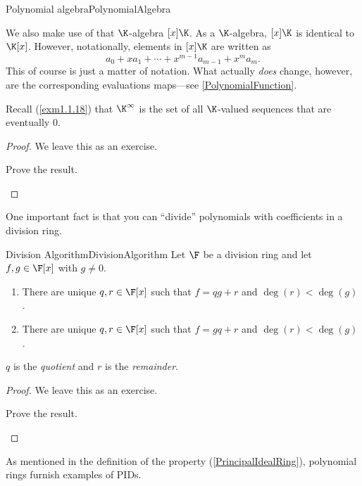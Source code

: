 \begin{prp}{Polynomial algebra}{PolynomialAlgebra}
\begin{rmk}
		We also make use of that $\K$-algebra $[x]\K$.  As a $\K$-algebra, $[x]\K$\index[notation]{$[x]\K$} is identical to $\K [x]$.  However, notationally, elements in $[x]\K$ are written as
		\begin{equation}
			a_0+xa_1+\cdots +x^{m-1}a_{m-1}+x^ma_m.
		\end{equation}
		This of course is just a matter of notation.  What actually \emph{does} change, however, are the corresponding evaluations maps---see \cref{PolynomialFunction}.
	\end{rmk}
	\begin{rmk}
		Recall (\cref{exm1.1.18}) that $\K ^{\infty}$ is the set of all $\K$-valued sequences that are eventually $0$.
	\end{rmk}
	\begin{proof}
		We leave this as an exercise.
		\begin{exr}[breakable=false]{}{}
			Prove the result.
		\end{exr}
	\end{proof}
\end{prp}
One important fact is that you can ``divide'' polynomials with coefficients in a division ring.
\begin{thm}{Division Algorithm}{DivisionAlgorithm}
	Let $\F$ be a division ring and let $f,g\in \F [x]$ with $g\neq 0$.
	\begin{enumerate}
		\item There are unique $q,r\in \F [x]$ such that $f=qg+r$ and $\deg (r)<\deg (g)$.
		\item There are unique $q,r\in \F [x]$ such that $f=gq+r$ and $\deg (r)<\deg (g)$.
	\end{enumerate}
	\begin{rmk}
		$q$ is the \emph{quotient} and $r$ is the \emph{remainder}.
	\end{rmk}
	\begin{proof}
		We leave this as an exercise.
		\begin{exr}[breakable=false]{}{}
			Prove the result.
		\end{exr}
	\end{proof}
\end{thm}
As mentioned in the definition of the property (\cref{PrincipalIdealRing}), polynomial rings furnish examples of PIDs.
